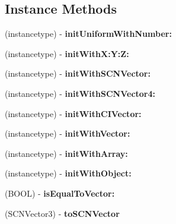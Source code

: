 \subsection*{Instance Methods}
\begin{DoxyCompactItemize}
\item 
\hypertarget{protocol_vector_export-p_abe4faf868d64a8f794caa5ebcbf6b694}{}(instancetype) -\/ {\bfseries init\+Uniform\+With\+Number\+:}\label{protocol_vector_export-p_abe4faf868d64a8f794caa5ebcbf6b694}

\item 
\hypertarget{protocol_vector_export-p_a6ab8ea15c61689418a8aa29307f95488}{}(instancetype) -\/ {\bfseries init\+With\+X\+:\+Y\+:\+Z\+:}\label{protocol_vector_export-p_a6ab8ea15c61689418a8aa29307f95488}

\item 
\hypertarget{protocol_vector_export-p_a49d9fbfa9e60f08099c1018dd552803f}{}(instancetype) -\/ {\bfseries init\+With\+S\+C\+N\+Vector\+:}\label{protocol_vector_export-p_a49d9fbfa9e60f08099c1018dd552803f}

\item 
\hypertarget{protocol_vector_export-p_a2fcbc883e9852d9f15f77bb279b96126}{}(instancetype) -\/ {\bfseries init\+With\+S\+C\+N\+Vector4\+:}\label{protocol_vector_export-p_a2fcbc883e9852d9f15f77bb279b96126}

\item 
\hypertarget{protocol_vector_export-p_ab6c1d3c986972d38d0ef4c153c5ed5da}{}(instancetype) -\/ {\bfseries init\+With\+C\+I\+Vector\+:}\label{protocol_vector_export-p_ab6c1d3c986972d38d0ef4c153c5ed5da}

\item 
\hypertarget{protocol_vector_export-p_a3695d614b0eea50e752ba86cecaa74b6}{}(instancetype) -\/ {\bfseries init\+With\+Vector\+:}\label{protocol_vector_export-p_a3695d614b0eea50e752ba86cecaa74b6}

\item 
\hypertarget{protocol_vector_export-p_a75d3d29efa4b1029bfedd39356733f21}{}(instancetype) -\/ {\bfseries init\+With\+Array\+:}\label{protocol_vector_export-p_a75d3d29efa4b1029bfedd39356733f21}

\item 
\hypertarget{protocol_vector_export-p_a0e19667f49c336f74bb85d31a85bb459}{}(instancetype) -\/ {\bfseries init\+With\+Object\+:}\label{protocol_vector_export-p_a0e19667f49c336f74bb85d31a85bb459}

\item 
\hypertarget{protocol_vector_export-p_a3eb86eb72dd95116afa2f2c77876a68e}{}(B\+O\+O\+L) -\/ {\bfseries is\+Equal\+To\+Vector\+:}\label{protocol_vector_export-p_a3eb86eb72dd95116afa2f2c77876a68e}

\item 
\hypertarget{protocol_vector_export-p_aa9c162aa2f00f7a4f15abaf44bf0b589}{}(S\+C\+N\+Vector3) -\/ {\bfseries to\+S\+C\+N\+Vector}\label{protocol_vector_export-p_aa9c162aa2f00f7a4f15abaf44bf0b589}

\end{DoxyCompactItemize}
